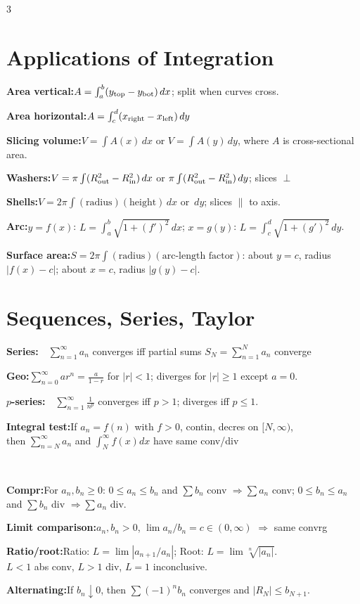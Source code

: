 \documentclass[10pt]{article}
\newcommand{\dd}{\,d}
\newcommand{\dx}{\,dx}
\newcommand{\dy}{\,dy}
\newenvironment{cheatitems}{\par\vspace{-2pt}}{\par\vspace{-2pt}}
\newcommand{\cheatrow}[2]{%
  \par\noindent\textbf{#1:}\nobreak\hspace{0.25em}#2\par
}
\begin{document}
\begin{multicols}{3}
\section*{Applications of Integration}
\begin{cheatitems}
\cheatrow{Area vertical}{$A=\int_a^b(y_{\rm top}-y_{\rm bot})\dx$; split when curves cross.}
\cheatrow{Area horizontal}{$A=\int_c^d(x_{\rm right}-x_{\rm left})\dy$}
\cheatrow{Slicing volume}{$V=\int A(x)\dx$ or $V=\int A(y)\dy$, where $A$ is cross-sectional area.}
\cheatrow{Washers}{$V=\pi\int(R_{\rm out}^2-R_{\rm in}^2)\dd x$ or $\pi\int(R_{\rm out}^2-R_{\rm in}^2)\dd y$; slices $\perp$}
\cheatrow{Shells}{$V=2\pi\int(\text{radius})(\text{height})\dd x$ or $\dd y$; slices $\parallel$ to axis.}
\cheatrow{Arc}{$y=f(x)$: $L=\int_a^b\sqrt{1+(f')^2}\dx$; $x=g(y)$: $L=\int_c^d\sqrt{1+(g')^2}\dy$.}
\cheatrow{Surface area}{$S=2\pi\int(\text{radius})(\text{arc-length factor})$: about $y=c$, radius $|f(x)-c|$; about $x=c$, radius $|g(y)-c|$.}
\end{cheatitems}

\section*{Sequences, Series, Taylor}
\begin{cheatitems}
\vspace{-5pt}
\cheatrow{Series}{$ \quad \sum_{n=1}^{\infty}a_n$ converges iff partial sums $\displaystyle S_N\!=\!\sum_{n=1}^Na_n$ converge}
\vspace{-10pt}
\cheatrow{Geo}{$\displaystyle \sum_{n=0}^{\infty}ar^n\!=\!\frac{a}{1-r}$ for $\displaystyle |r|<1$; diverges for $\displaystyle |r|\ge1$ except $a\!=\!0$.}
\vspace{-3pt}
\cheatrow{$p$-series}{$\quad \sum_{n=1}^{\infty}\frac1{n^p}$ converges iff $\displaystyle p>1$; diverges iff $\displaystyle p\le1$.}

\cheatrow{Integral test}{If $a_n\!=\!f(n)$ with $f>0$, contin, decres on $[N,\infty)$,
\\ then $\displaystyle\sum_{n=N}^\infty a_n$ and $\displaystyle\int_N^\infty f(x)dx$ have same conv/div}
\
\cheatrow{Compr}{For $\displaystyle a_n,b_n\ge0$: $\displaystyle 0\le a_n\le b_n$ and $ \sum b_n$ conv $\Rightarrow\sum a_n$ conv; $\displaystyle 0\le b_n\le a_n$ and $ \sum b_n$ div $\Rightarrow\sum a_n$ div.}


\cheatrow{Limit comparison}{$a_n,b_n>0$, $\lim a_n/b_n=c\in(0,\infty)$ $\Rightarrow$ same convrg}
\cheatrow{Ratio/root}{Ratio: $L=\lim|a_{n+1}/a_n|$; Root: $L=\lim\sqrt[n]{|a_n|}$. \\ $L<1$ abs conv, $L>1$ div, $L=1$ inconclusive.} \cheatrow{Alternating}{If $b_n\downarrow0$, then $\sum(-1)^nb_n$ converges and $|R_N|\le b_{N+1}$.} \end{cheatitems}



\end{multicols}
\end{document}

